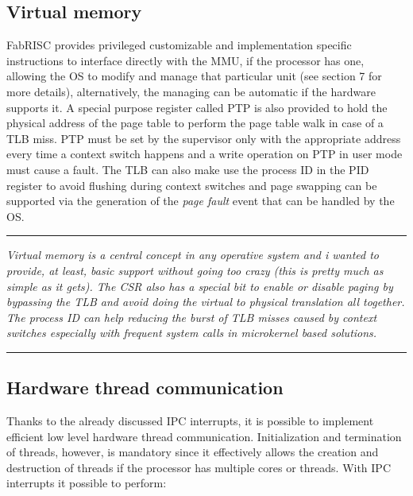     \subsection{Virtual memory}

        \vspace{10pt}

        FabRISC provides privileged customizable and implementation specific instructions to interface directly with the MMU, if the processor has one, allowing the OS to modify and manage that particular unit (see section 7 for more details), alternatively, the managing can be automatic if the hardware supports it. A special purpose register called PTP is also provided to hold the physical address of the page table to perform the page table walk in case of a TLB miss. PTP must be set by the supervisor only with the appropriate address every time a context switch happens and a write operation on PTP in user mode must cause a fault. The TLB can also make use the process ID in the PID register to avoid flushing during context switches and page swapping can be supported via the generation of the \textit{page fault} event that can be handled by the OS.

    \par\noindent\rule{\textwidth}{0.4pt}
    \textit{Virtual memory is a central concept in any operative system and i wanted to provide, at least, basic support without going too crazy (this is pretty much as simple as it gets). The CSR also has a special bit to enable or disable paging by bypassing the TLB and avoid doing the virtual to physical translation all together. The process ID can help reducing the burst of TLB misses caused by context switches especially with frequent system calls in microkernel based solutions.}
        \par\noindent\rule{\textwidth}{0.4pt}

    \subsection{Hardware thread communication}

        \vspace{10pt}

        Thanks to the already discussed IPC interrupts, it is possible to implement efficient low level hardware thread communication. Initialization and termination of threads, however, is mandatory since it effectively allows the creation and destruction of threads if the processor has multiple cores or threads. With IPC interrupts it possible to perform:

